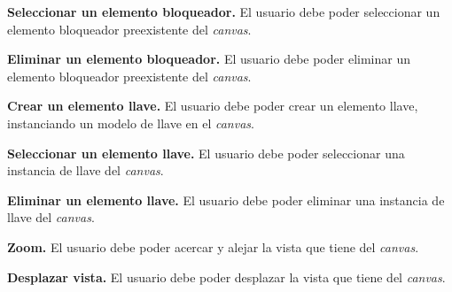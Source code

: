 	\item \textbf{Seleccionar un elemento bloqueador.}\newline
		El usuario debe poder seleccionar un elemento bloqueador preexistente del \textit{canvas}.
	\item \textbf{Eliminar un elemento bloqueador.}\newline
		El usuario debe poder eliminar un elemento bloqueador preexistente del \textit{canvas}.
	\item \textbf{Crear un elemento llave.}\newline
		El usuario debe poder crear un elemento llave, instanciando un modelo de llave en el \textit{canvas}.
	\item \textbf{Seleccionar un elemento llave.}\newline
		El usuario debe poder seleccionar una instancia de llave del \textit{canvas}.
	\item \textbf{Eliminar un elemento llave.}\newline
		El usuario debe poder eliminar una instancia de llave del \textit{canvas}.
	\item \textbf{Zoom.}\newline
		El usuario debe poder acercar y alejar la vista que tiene del \textit{canvas}.
	\item \textbf{Desplazar vista.}\newline
		El usuario debe poder desplazar la vista que tiene del \textit{canvas}.
